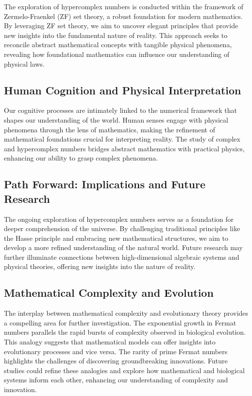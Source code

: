 \documentclass[12pt]{article}
\begin{document}
The exploration of hypercomplex numbers is conducted within the framework of Zermelo-Fraenkel (ZF) set theory, a robust foundation for modern mathematics. By leveraging ZF set theory, we aim to uncover elegant principles that provide new insights into the fundamental nature of reality. This approach seeks to reconcile abstract mathematical concepts with tangible physical phenomena, revealing how foundational mathematics can influence our understanding of physical laws.

\subsection{Human Cognition and Physical Interpretation}

Our cognitive processes are intimately linked to the numerical framework that shapes our understanding of the world. Human senses engage with physical phenomena through the lens of mathematics, making the refinement of mathematical foundations crucial for interpreting reality. The study of complex and hypercomplex numbers bridges abstract mathematics with practical physics, enhancing our ability to grasp complex phenomena.

\subsection{Path Forward: Implications and Future Research}

The ongoing exploration of hypercomplex numbers serves as a foundation for deeper comprehension of the universe. By challenging traditional principles like the Hasse principle and embracing new mathematical structures, we aim to develop a more refined understanding of the natural world. Future research may further illuminate connections between high-dimensional algebraic systems and physical theories, offering new insights into the nature of reality.

\subsection{Mathematical Complexity and Evolution}

The interplay between mathematical complexity and evolutionary theory provides a compelling area for further investigation. The exponential growth in Fermat numbers parallels the rapid bursts of complexity observed in biological evolution. This analogy suggests that mathematical models can offer insights into evolutionary processes and vice versa. The rarity of prime Fermat numbers highlights the challenges of discovering groundbreaking innovations. Future studies could refine these analogies and explore how mathematical and biological systems inform each other, enhancing our understanding of complexity and innovation.
\end{document}
